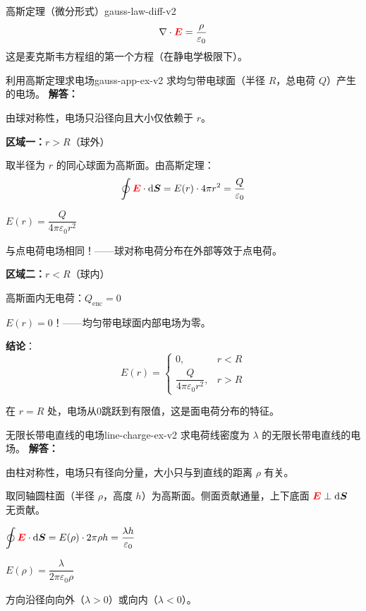 \documentclass[11pt,a4paper,openany,oneside]{book}
\newcommand{\diff}{\mathrm{d}}
\newcommand{\vecE}{\textcolor{red}{\vect{E}}}
\newcommand{\eps}{\varepsilon}
\newcommand{\vect}[1]{\bm{#1}}
\newcommand{\divg}{\nabla\cdot}
\newcommand{\difficulty}[1]{\marginnote{\textcolor{red}{\textbf{[#1]}}}}
\begin{document}
\begin{theorem}{高斯定理（微分形式）}{gauss-law-diff-v2}
\[
\divg\vecE = \frac{\rho}{\eps_0}
\]
这是麦克斯韦方程组的第一个方程（在静电学极限下）。
\end{theorem}

\begin{example}{利用高斯定理求电场}{gauss-app-ex-v2}
\difficulty{基础}
求均匀带电球面（半径 $R$，总电荷 $Q$）产生的电场。
\tcblower
\textbf{解答：}

由球对称性，电场只沿径向且大小仅依赖于 $r$。

\textbf{区域一：$r > R$}（球外）

取半径为 $r$ 的同心球面为高斯面。由高斯定理：
\[
\oint \vecE \cdot \diff\vect{S} = E(r) \cdot 4\pi r^2 = \frac{Q}{\eps_0}
\]

$E(r) = \dfrac{Q}{4\pi\eps_0 r^2}$

与点电荷电场相同！——球对称电荷分布在外部等效于点电荷。

\textbf{区域二：$r < R$}（球内）

高斯面内无电荷：$Q_{\text{enc}} = 0$

$E(r) = 0$！——均匀带电球面内部电场为零。

\textbf{结论}：
\[
E(r) = \begin{cases} 0, & r < R \\ \dfrac{Q}{4\pi\eps_0 r^2}, & r > R \end{cases}
\]

在 $r = R$ 处，电场从0跳跃到有限值，这是面电荷分布的特征。
\end{example}

\begin{example}{无限长带电直线的电场}{line-charge-ex-v2}
\difficulty{基础}
求电荷线密度为 $\lambda$ 的无限长带电直线的电场。
\tcblower
\textbf{解答：}

由柱对称性，电场只有径向分量，大小只与到直线的距离 $\rho$ 有关。

取同轴圆柱面（半径 $\rho$，高度 $h$）为高斯面。侧面贡献通量，上下底面 $\vecE \perp \diff\vect{S}$ 无贡献。

$\displaystyle\oint \vecE \cdot \diff\vect{S} = E(\rho) \cdot 2\pi\rho h = \frac{\lambda h}{\eps_0}$

$E(\rho) = \dfrac{\lambda}{2\pi\eps_0 \rho}$

方向沿径向向外（$\lambda > 0$）或向内（$\lambda < 0$）。
\end{example}
\end{document}
